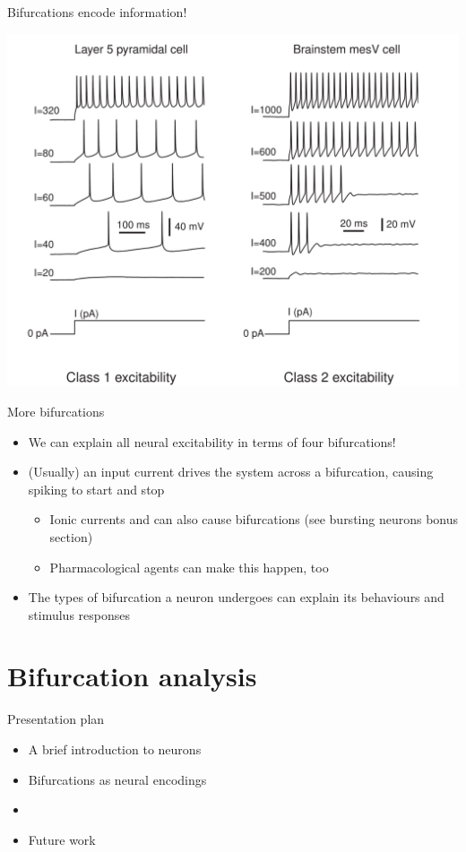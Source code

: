 \documentclass[presentation]{beamer}
\begin{document}
\begin{frame}[plain,label={sec:orga0b0649}]{Bifurcations encode information!}
\begin{center}
\includegraphics[height=1.1\textheight]{./excitability_classes.png}
\end{center}
\end{frame}

\begin{frame}[label={sec:org65cb833}]{More bifurcations}
\begin{itemize}
\item We can explain all neural excitability in terms of four bifurcations!
\item (Usually) an input current drives the system across a bifurcation, causing spiking to start and stop
\begin{itemize}
\item Ionic currents and can also cause bifurcations (see bursting neurons bonus section)
\item Pharmacological agents can make this happen, too
\end{itemize}
\item The types of bifurcation a neuron undergoes can explain its behaviours and stimulus responses
\end{itemize}
\end{frame}


\section{Bifurcation analysis}
\label{sec:org5580387}
\begin{frame}[label={sec:org4ee9fd5}]{Presentation plan}
\begin{itemize}
\item A brief introduction to neurons
\item Bifurcations as neural encodings
\item \color{bristolred}{Methods for bifurcation analysis}
\item \color{black} Future work
\end{itemize}
\end{frame}
\end{document}
